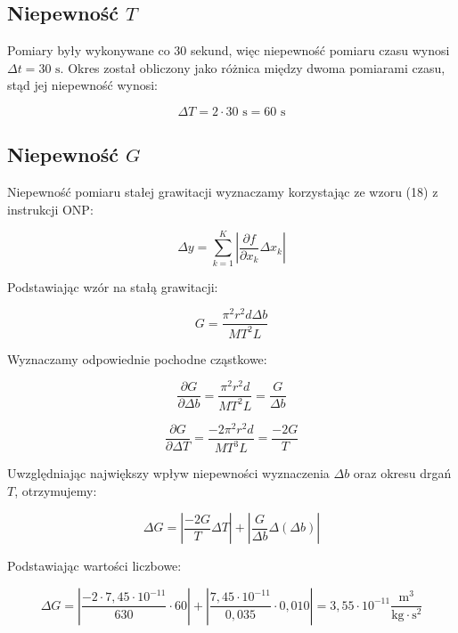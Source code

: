 \documentclass[a4paper,12pt]{article}
\begin{document}
\subsection{Niepewność $T$}

Pomiary były wykonywane co 30 sekund, więc niepewność pomiaru czasu wynosi $\Delta t = 30 \text{ s}$.
Okres został obliczony jako różnica między dwoma pomiarami czasu, stąd jej niepewność wynosi:

$$
    \Delta T = 2 \cdot 30 \text{ s} = 60 \text{ s}
$$

\subsection{Niepewność $G$}

Niepewność pomiaru stałej grawitacji wyznaczamy korzystając ze wzoru (18) z instrukcji ONP:

\begin{equation*}
    \label{eq:delta_y}
    \Delta y = \sum_{k=1}^{K} \left| \frac{\partial f}{\partial x_k} \Delta x_k \right|
\end{equation*}

Podstawiając wzór na stałą grawitacji:

\begin{equation*}
    \label{eq:g}
    G = \frac{\pi^2 r^2 d \Delta b}{MT^2L}
\end{equation*}

Wyznaczamy odpowiednie pochodne cząstkowe:

\begin{equation*}
    \frac{\partial G}{\partial \Delta b} = \frac{\pi^2 r^2 d}{MT^2L} = \frac{G}{\Delta b}
\end{equation*}

\begin{equation*}
    \frac{\partial G}{\partial \Delta T} = \frac{-2\pi^2 r^2 d}{MT^3L} = \frac{-2G}{T}
\end{equation*}

Uwzględniając największy wpływ niepewności wyznaczenia $\Delta b$ oraz okresu drgań $T$, otrzymujemy:

\begin{equation*}
    \Delta G = | \frac{-2G}{T} \Delta T | + | \frac{G}{\Delta b} \Delta( \Delta b ) |
\end{equation*}

Podstawiając wartości liczbowe:

\begin{equation*}
    \Delta G = | \frac{-2 \cdot 7{,}45 \cdot 10^{-11}}{630} \cdot 60 | + | \frac{7{,}45 \cdot 10^{-11}}{0{,}035} \cdot 0{,}010 |
    = 3{,}55 \cdot 10^{-11} \frac{\text{m}^3}{\text{kg} \cdot \text{s}^2}
\end{equation*}
\end{document}
